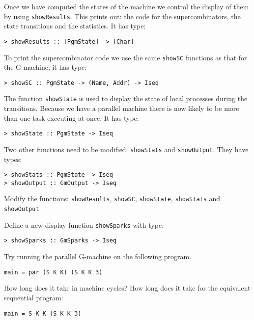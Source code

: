 Once we have computed the states of the machine we control the display
of them by using \mbox{\tt showResults}. This prints out: the code for the
supercombinators, the state transitions and the statistics. It has
type:
\begin{verbatim}
> showResults :: [PgmState] -> [Char]
\end{verbatim}
%
\par
To print the supercombinator code we use the same \mbox{\tt showSC} functions as
that for the G-machine; it has type:
\begin{verbatim}
> showSC :: PgmState -> (Name, Addr) -> Iseq
\end{verbatim}
%
\par
The function \mbox{\tt showState} is used to display the state of local processes
during the transitions. Because we have a parallel machine there is now
likely to be more than one task executing at once. It has type:
\begin{verbatim}
> showState :: PgmState -> Iseq
\end{verbatim}
%
\par
Two other functions need to be modified: \mbox{\tt showStats} and
\mbox{\tt showOutput}. They have types:
\begin{verbatim}
> showStats :: PgmState -> Iseq
> showOutput :: GmOutput -> Iseq
\end{verbatim}
%
%
\begin{exercise}\label{pgm:X:show1}
Modify the functions: \mbox{\tt showResults}, \mbox{\tt showSC}, \mbox{\tt showState}, \mbox{\tt showStats} and
\mbox{\tt showOutput}.

Define a new display function \mbox{\tt showSparks} with type:
\begin{verbatim}
> showSparks :: GmSparks -> Iseq
\end{verbatim}
%
\end{exercise}

\begin{exercise}\label{pgm:X:trivial}
Try running the parallel G-machine on the following program.
\begin{verbatim}
main = par (S K K) (S K K 3)
\end{verbatim}
How long does it take in machine cycles? How long does it take for the
equivalent sequential program:
\begin{verbatim}
main = S K K (S K K 3)
\end{verbatim}
\end{exercise}

